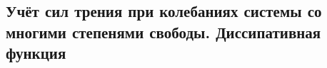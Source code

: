 

\subsection{Учёт сил трения при колебаниях системы со многими степенями свободы. Диссипативная функция}



